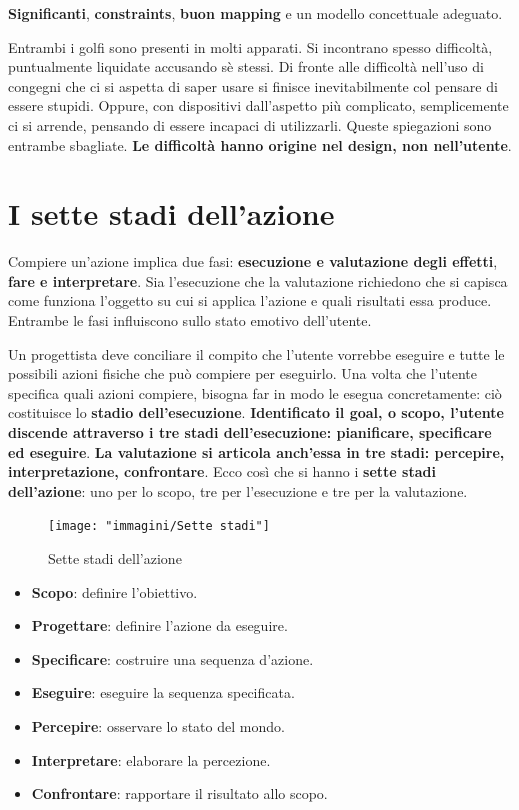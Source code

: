 \textbf{Significanti}, \textbf{constraints}, \textbf{buon mapping} e un modello concettuale adeguato.
\vspace{\baselineskip}

Entrambi i golfi sono presenti in molti apparati. Si incontrano spesso difficoltà, puntualmente liquidate accusando sè stessi. Di fronte
alle difficoltà nell'uso di congegni che ci si aspetta di saper usare si finisce inevitabilmente col pensare di essere stupidi. Oppure,
con dispositivi dall'aspetto più complicato, semplicemente ci si arrende, pensando di essere incapaci di utilizzarli. Queste spiegazioni
sono entrambe sbagliate. \textbf{Le difficoltà hanno origine nel design, non nell'utente}.

\section{I sette stadi dell'azione}
Compiere un'azione implica due fasi: \textbf{esecuzione e valutazione degli effetti}, \textbf{fare e interpretare}. Sia l'esecuzione
che la valutazione richiedono che si capisca come funziona l'oggetto su cui si applica l'azione e quali risultati essa produce. Entrambe
le fasi influiscono sullo stato emotivo dell'utente.

Un progettista deve conciliare il compito che l'utente vorrebbe eseguire e tutte le possibili azioni fisiche che può compiere per
eseguirlo. Una volta che l'utente specifica quali azioni compiere, bisogna far in modo le esegua concretamente: ciò costituisce lo
\textbf{stadio dell'esecuzione}. \textbf{Identificato il goal, o scopo, l'utente discende attraverso i tre stadi dell'esecuzione: pianificare,
specificare ed eseguire}. \textbf{La valutazione si articola anch'essa in tre stadi: percepire, interpretazione, confrontare}.
Ecco così che si hanno i \textbf{sette stadi dell'azione}: uno per lo scopo, tre per l'esecuzione e tre per la valutazione.
\begin{figure}[!hb]
	\centering
	\texttt{[image: "immagini/Sette stadi"]}
	\caption{Sette stadi dell'azione}
\end{figure}
\begin{itemize}
	\itemsep-0.3em
	\item \textbf{Scopo}: definire l'obiettivo.
	\item \textbf{Progettare}: definire l'azione da eseguire.
	\item \textbf{Specificare}: costruire una sequenza d'azione.
	\item \textbf{Eseguire}: eseguire la sequenza specificata.
	\item \textbf{Percepire}: osservare lo stato del mondo.
	\item \textbf{Interpretare}: elaborare la percezione.
	\item \textbf{Confrontare}: rapportare il risultato allo scopo.
\end{itemize}

